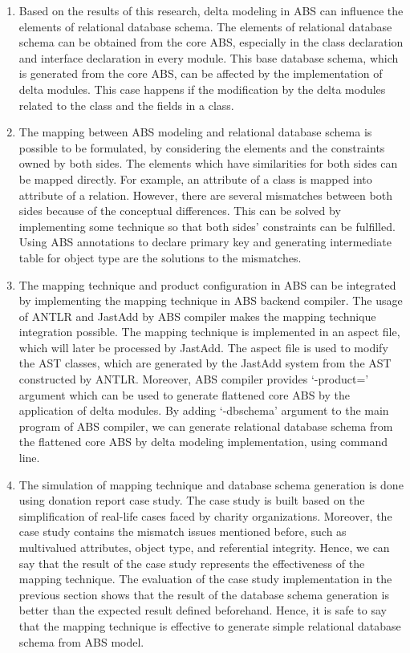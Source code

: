 \documentclass[runningheads,a4paper]{llncs}
\begin{document}
\begin{enumerate}
	\item Based on the results of this research, delta modeling in ABS can influence the elements of relational database schema.  The elements of relational database schema can be obtained from the core ABS, especially in the class declaration and interface declaration in every module. This base database schema, which is generated from the core ABS, can be affected by the implementation of delta modules. This case happens if the modification by the delta modules related to the class and the fields in a class.
	\item The mapping between ABS modeling and relational database schema is possible to be formulated, by considering the elements and the constraints owned by both sides. The elements which have similarities for both sides can be mapped directly. For example, an attribute of a class is mapped into attribute of a relation. However, there are several mismatches between both sides because of the conceptual differences. This can be solved by implementing some technique so that both sides’ constraints can be fulfilled. Using ABS annotations to declare primary key and generating intermediate table for object type are the solutions to the mismatches.
	\item The mapping technique and product configuration in ABS can be integrated by implementing the mapping technique in ABS backend compiler. The usage of ANTLR and JastAdd by ABS compiler makes the mapping technique integration possible. The mapping technique is implemented in an aspect file, which will later be processed by JastAdd. The aspect file is used to modify the AST classes, which are generated by the JastAdd system from the AST constructed by ANTLR. Moreover, ABS compiler provides ‘-product=’ argument which can be used to generate flattened core ABS by the application of delta modules. By adding ‘-dbschema’ argument to the main program of ABS compiler, we can generate relational database schema from the flattened core ABS by delta modeling implementation, using command line.
	\item The simulation of mapping technique and database schema generation is done using donation report case study. The case study is built based on the simplification of real-life cases faced by charity organizations. Moreover, the case study contains the mismatch issues mentioned before, such as multivalued attributes, object type, and referential integrity. Hence, we can  say that the result of the case study represents the effectiveness of the mapping technique. The evaluation of the case study implementation in the previous section shows that the result of the database schema generation is better than the expected result defined beforehand. Hence, it is safe to say that the mapping technique is effective to generate simple relational database schema from ABS model.
\end{enumerate}
\end{document}
